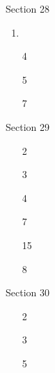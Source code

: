 







Section 28

 \begin{enumerate}

   \item 
   \pagebreak
   \item[4] 
   \pagebreak
   \item[5] 
   \pagebreak
   \item[7] 

 \end{enumerate}

Section 29

 \begin{enumerate}

	\item[2] 
	\pagebreak
	\item[3] 
	\pagebreak
	\item[4] 
	\pagebreak
	\item[7] 
	\pagebreak
	\item[15] 
	\pagebreak
	\item[8] 
 
  \end{enumerate}

Section 30

\begin{enumerate}

	\item[2] 
	\pagebreak
	\item[3] 
	\pagebreak
	\item[5] 
 
  \end{enumerate}


